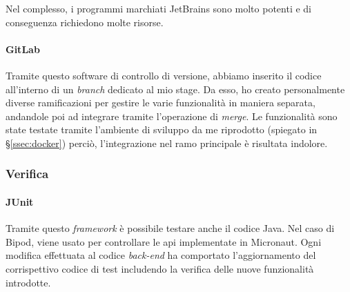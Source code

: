 Nel complesso, i programmi marchiati JetBrains sono molto potenti e di conseguenza richiedono molte risorse.
\paragraph{GitLab}
Tramite questo software di controllo di versione, abbiamo inserito il codice all'interno di un \textit{branch} dedicato al mio stage. Da esso, ho creato personalmente diverse ramificazioni per gestire le varie funzionalità in maniera separata, andandole poi ad integrare tramite l'operazione di \textit{merge}. Le funzionalità sono state testate tramite l'ambiente di sviluppo da me riprodotto (spiegato in \S\ref{ssec:docker}) perciò, l'integrazione nel ramo principale è risultata indolore.
\newpage
\subsubsection{Verifica}
\paragraph{JUnit}
Tramite questo \textit{framework} è possibile testare anche il codice Java. Nel caso di Bipod, viene usato per controllare le \acrshort{api} implementate in Micronaut. Ogni modifica effettuata al codice \textit{back-end} ha comportato l'aggiornamento del corrispettivo codice di test includendo la verifica delle nuove funzionalità introdotte.
